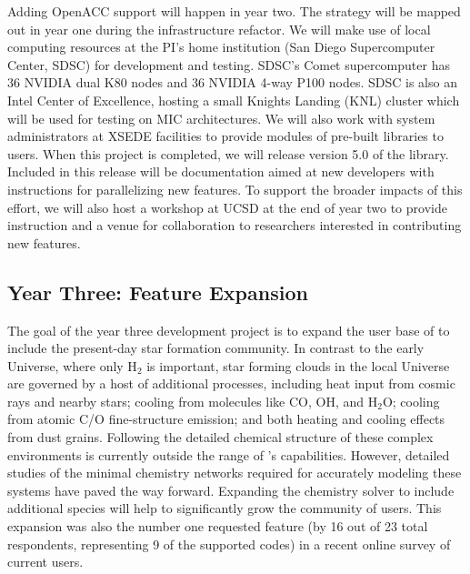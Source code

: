 Adding OpenACC support will happen in year two.  The strategy will be
mapped out in year one during the infrastructure refactor.  We will
make use of local computing resources at the PI's home institution
(San Diego Supercomputer Center, SDSC) for development and testing.
SDSC's Comet supercomputer has 36 NVIDIA dual K80 nodes and 36 NVIDIA
4-way P100 nodes.  SDSC is also an Intel Center of Excellence, hosting
a small Knights Landing (KNL) cluster which will be used for testing
on MIC architectures.
We will also work with system administrators at XSEDE facilities to
provide modules of pre-built \grackle{} libraries to users.  When this
project is completed, we will
release version 5.0 of the \grackle{} library.  Included in this
release will be documentation aimed at new developers with
instructions for parallelizing new features.  To support the broader
impacts of this effort, we will also host a
workshop at UCSD at the end of year two to provide instruction and
a venue for collaboration to researchers interested in contributing
new features.

\subsection{Year Three: Feature Expansion}

The goal of the year three development project is to expand the user
base of \grackle{} to include the present-day star formation
community.  
In contrast to the early Universe, where only H$_{2}$ is important,
star forming clouds in the local Universe are governed by a host of
additional processes, including heat input from cosmic rays and nearby
stars; cooling from molecules like CO, OH, and H$_{2}$O; cooling from
atomic C/O fine-structure emission; and both heating and cooling
effects from dust grains.  Following the detailed chemical structure
of these complex environments is currently outside the range of
\grackle{}'s capabilities.  However, detailed studies of the minimal
chemistry networks required for accurately modeling these systems
\citep{2012MNRAS.421..116G, 2016arXiv161009023G} have paved the way
forward.  Expanding the chemistry solver to include additional species
will help to significantly grow the community of \grackle{} users.
This expansion was also the number one requested feature (by 16 out of
23 total respondents, representing 9 of the supported codes) in a
recent online survey of current \grackle{} users.

